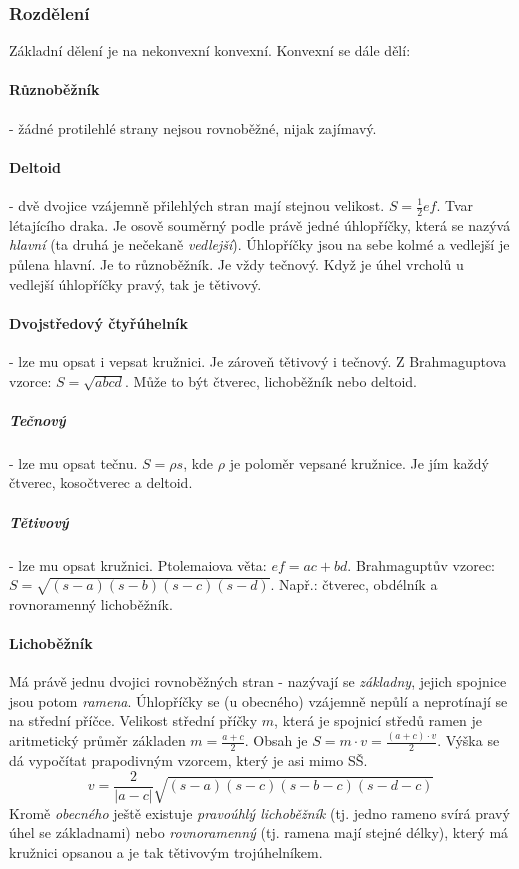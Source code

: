 \documentclass[12pt]{article}
\begin{document}
\subsubsection{Rozdělení}
Základní dělení je na nekonvexní konvexní. Konvexní se dále dělí:
\paragraph{Různoběžník} - žádné protilehlé strany nejsou rovnoběžné, nijak zajímavý.
\paragraph{Deltoid} - dvě dvojice vzájemně přilehlých stran mají stejnou velikost. $S = \frac{1}{2}ef$. Tvar létajícího draka. Je osově souměrný podle právě jedné úhlopříčky, která se nazývá \emph{hlavní} (ta druhá je nečekaně \emph{vedlejší}). Úhlopříčky jsou na sebe kolmé a vedlejší je půlena hlavní. Je to různoběžník. Je vždy tečnový. Když je úhel vrcholů u vedlejší úhlopříčky pravý, tak je tětivový.
\paragraph{Dvojstředový čtyřúhelník} - lze mu opsat i vepsat kružnici. Je zároveň tětivový i tečnový. Z Brahmaguptova vzorce: $S = \sqrt{abcd}$. Může to být čtverec, lichoběžník nebo deltoid.
\subparagraph{Tečnový} - lze mu opsat tečnu. $S= \rho s$, kde $\rho$ je poloměr vepsané kružnice. Je jím každý čtverec, kosočtverec a deltoid.
\subparagraph{Tětivový} - lze mu opsat kružnici. Ptolemaiova věta: $ef = ac +bd$. Brahmaguptův vzorec:  $S=\sqrt{(s-a)(s-b)(s-c)(s-d)}$. Např.: čtverec, obdélník a rovnoramenný lichoběžník.
\paragraph{Lichoběžník}
Má právě jednu dvojici rovnoběžných stran - nazývají se \emph{základny}, jejich spojnice jsou potom \emph{ramena}. Úhlopříčky se  (u obecného) vzájemně nepůlí a neprotínají se na střední příčce. Velikost střední příčky $m$, která je spojnicí středů ramen je aritmetický průměr základen $m=\frac{a+c}{2}$. Obsah je $S = m\cdot v = \frac{(a+c)\cdot v}{2}$. Výška se dá vypočítat prapodivným vzorcem, který je asi mimo SŠ.
\begin{equation}
v = \frac{2}{|a-c|}\sqrt{(s-a)(s-c)(s-b-c)(s-d-c)}
\end{equation}
Kromě \emph{obecného} ještě existuje \emph{pravoúhlý lichoběžník} (tj. jedno rameno svírá pravý úhel se základnami) nebo \emph{rovnoramenný} (tj. ramena mají stejné délky), který má kružnici opsanou a je tak tětivovým trojúhelníkem.
\end{document}
